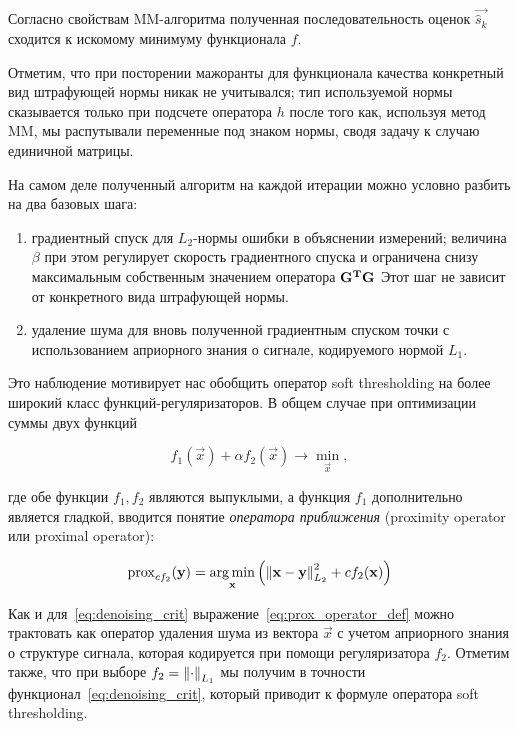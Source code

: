Согласно свойствам MM-алгоритма полученная последовательность оценок
$\vec{\hat{s}_k}$ сходится к искомому минимуму функционала $f$.

Отметим, что при посторении мажоранты для функционала качества конкретный вид
штрафующей нормы никак не учитывался; тип используемой нормы сказывается только
при подсчете оператора $h$ после того как, используя метод MM, мы распутывали
переменные под знаком нормы, сводя задачу к случаю единичной матрицы.

На самом деле полученный алгоритм на каждой итерации можно условно разбить на два базовых
шага: 

\begin{enumerate}
    \item градиентный спуск для $L_2$-нормы ошибки в объяснении измерений;
        величина $\beta$ при этом регулирует скорость градиентного спуска и ограничена
        снизу максимальным собственным значением оператора $\mathbf{G^TG}$
        Этот шаг не зависит от конкретного вида штрафующей нормы.
    \item удаление шума для вновь полученной градиентным спуском точки с
        использованием априорного знания о сигнале, кодируемого нормой $L_1$.
\end{enumerate}

Это наблюдение мотивирует нас обобщить оператор soft thresholding на
более широкий класс функций-регуляризаторов. В общем случае
при оптимизации суммы двух функций

\begin{equation}
    f_1(\vec{x}) + \alpha f_2(\vec{x}) \rightarrow \underset{\vec{x}}\min,
\end{equation}

где обе функции $f_1, f_2$ являются выпуклыми, а функция $f_1$ дополнительно
является гладкой, вводится понятие \emph{оператора приближения} (proximity
operator или proximal operator):

\begin{equation}
    \operatorname{prox}_{c f_2}(\mathbf{y}) = \operatorname*{arg\,min}_{\mathbf{x}}\left(\left\lVert\mathbf{x - y}\right\rVert^2_{L_2} + c f_2(\mathbf{x})\right)
    \label{eq:prox_operator_def}
\end{equation}

Как и для~\ref{eq:denoising_crit} выражение~\ref{eq:prox_operator_def} можно
трактовать как оператор удаления шума из вектора $\vec{x}$ с учетом априорного
знания о структуре сигнала, которая кодируется при помощи регуляризатора $f_2$.
Отметим также, что при выборе $f_2 = \left\lVert\cdot\right\rVert_{L_1}$ мы получим в точности
функционал~\ref{eq:denoising_crit}, который приводит к формуле оператора
soft thresholding.

